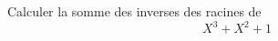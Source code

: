 Calculer la somme des inverses des racines de
\begin{displaymath}
 X^3+X^2+1
\end{displaymath}

\bigskip